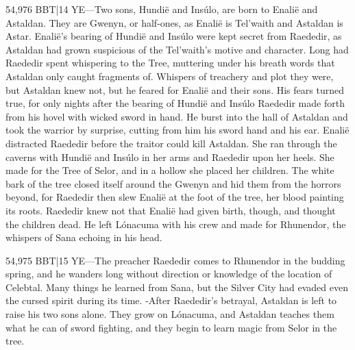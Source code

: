 \documentclass[smalldemyvopaper,11pt,twoside,onecolumn,openright,extrafontsizes]{memoir}
\begin{document}
54,976 BBT|14 YE—Two sons, Hundië and Insúlo, are born to Enalië and Astaldan. They are Gwenyn, or half-ones, as Enalië is Tel’waith and Astaldan is Astar. Enalië’s bearing of Hundië and Insúlo were kept secret from Raededir, as Astaldan had grown suspicious of the Tel’waith’s motive and character. Long had Raededir spent whispering to the Tree, muttering under his breath words that Astaldan only caught fragments of. Whispers of treachery and plot they were, but Astaldan knew not, but he feared for Enalië and their sons. His fears turned true, for only nights after the bearing of Hundië and Insúlo Raededir made forth from his hovel with wicked sword in hand. He burst into the hall of Astaldan and took the warrior by surprise, cutting from him his sword hand and his ear. Enalië distracted Raededir before the traitor could kill Astaldan. She ran through the caverns with Hundië and Insúlo in her arms and Raededir upon her heels. She made for the Tree of Selor, and in a hollow she placed her children. The white bark of the tree closed itself around the Gwenyn and hid them from the horrors beyond, for Raededir then slew Enalië at the foot of the tree, her blood painting its roots. Raededir knew not that Enalië had given birth, though, and thought the children dead. He left Lónacuma with his crew and made for Rhunendor, the whispers of Sana echoing in his head.

54,975 BBT|15 YE—The preacher Raededir comes to Rhunendor in the budding spring, and he wanders long without direction or knowledge of the location of Celebtal. Many things he learned from Sana, but the Silver City had evaded even the cursed spirit during its time.
-After Raededir’s betrayal, Astaldan is left to raise his two sons alone. They grow on Lónacuma, and Astaldan teaches them what he can of sword fighting, and they begin to learn magic from Selor in the tree.
\end{document}
